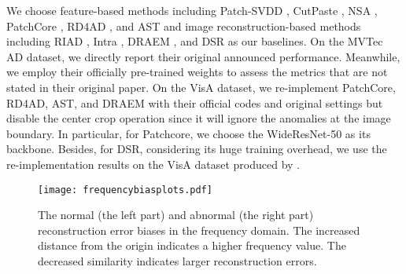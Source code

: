 \documentclass[5p, twocolumn]{elsarticle}[draft]
\begin{document}
We choose feature-based methods including Patch-SVDD \cite{yi2020patch}, CutPaste \cite{li2021cutpaste}, NSA \cite{schluter2022natural}, PatchCore \cite{roth2022towards}, RD4AD \cite{deng2022anomaly}, and AST \cite{rudolph2023asymmetric} and image reconstruction-based methods including RIAD \cite{zavrtanik2021reconstruction}, Intra \cite{pirnay2022inpainting}, DRAEM \cite{zavrtanik2021draem}, and DSR \cite{zavrtanik2022dsr} as our baselines. On the MVTec AD dataset, we directly report their original announced performance. Meanwhile, we employ their officially pre-trained weights to assess the metrics that are not stated in their original paper. On the VisA dataset, we re-implement PatchCore, RD4AD, AST, and DRAEM with their official codes and original settings but disable the center crop operation since it will ignore the anomalies at the image boundary. In particular, for Patchcore, we choose the WideResNet-50 \cite{he2016deep} as its backbone. Besides, for DSR, considering its huge training overhead, we use the re-implementation results on the VisA dataset produced by \cite{batzner2023efficientad}.



\begin{figure*}[h]
    \centering
		\texttt{[image: frequencybiasplots.pdf]}
	\caption{The normal (the left part) and abnormal (the right part) reconstruction error biases in the frequency domain. The increased distance from the origin indicates a higher frequency value. The decreased similarity indicates larger reconstruction errors.}
	\label{frequencybiasplots}
\end{figure*}
\end{document}
